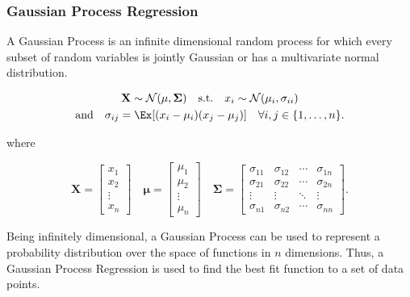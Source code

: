 \documentclass[\econtexRoot/SequentialEGM]{subfiles}
\begin{document}

\subsubsection{Gaussian Process Regression}

A Gaussian Process is an infinite dimensional random process for which every subset of random variables is jointly Gaussian or has a multivariate normal distribution.

\begin{equation}
	\begin{gathered}
		\mathbf{X} \sim \mathcal{N}(\mathbf{\mu}, \mathbf{\Sigma}) \quad \text{s.t.} \quad x_i \sim \mathcal{N}(\mu_i, \sigma_{ii}) \\
		\text{and} \quad  \sigma_{ij} = \Ex[(x_i - \mu_i)(x_j - \mu_j)] \quad \forall i,j \in \{1, \ldots, n\}.
	\end{gathered}
\end{equation}


where

\begin{equation}
	\mathbf{X} = \begin{bmatrix}
		x_1    \\
		x_2    \\
		\vdots \\
		x_n
	\end{bmatrix}
	\quad
	\mathbf{\mu} = \begin{bmatrix}
		\mu_1  \\
		\mu_2  \\
		\vdots \\
		\mu_n
	\end{bmatrix}
	\quad
	\mathbf{\Sigma} = \begin{bmatrix}
		\sigma_{11} & \sigma_{12} & \cdots & \sigma_{1n} \\
		\sigma_{21} & \sigma_{22} & \cdots & \sigma_{2n} \\
		\vdots      & \vdots      & \ddots & \vdots      \\
		\sigma_{n1} & \sigma_{n2} & \cdots & \sigma_{nn}
	\end{bmatrix}.
\end{equation}

Being infinitely dimensional, a Gaussian Process can be used to represent a probability distribution over the space of functions in $n$ dimensions. Thus, a Gaussian Process Regression is used to find the best fit function to a set of data points.
\end{document}

